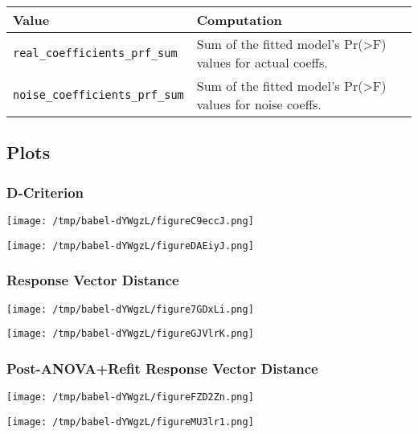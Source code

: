 \documentclass[11pt]{article}
\begin{document}
\begin{center}
\begin{tabular}{ll}
Value & Computation\\
\hline
\texttt{real\_coefficients\_prf\_sum} & Sum of the fitted model's Pr(>F) values for actual coeffs.\\
\texttt{noise\_coefficients\_prf\_sum} & Sum of the fitted model's Pr(>F) values for noise coeffs.\\
\end{tabular}
\end{center}

\subsection{Plots}
\label{sec:org143801b}
\subsubsection{D-Criterion}
\label{sec:orge3fefdf}
\begin{center}
\texttt{[image: /tmp/babel-dYWgzL/figureC9eccJ.png]}
\end{center}

\begin{center}
\texttt{[image: /tmp/babel-dYWgzL/figureDAEiyJ.png]}
\end{center}

\subsubsection{Response Vector Distance}
\label{sec:org4b58813}
\begin{center}
\texttt{[image: /tmp/babel-dYWgzL/figure7GDxLi.png]}
\end{center}

\begin{center}
\texttt{[image: /tmp/babel-dYWgzL/figureGJVlrK.png]}
\end{center}

\subsubsection{Post-ANOVA+Refit Response Vector Distance}
\label{sec:orgec1cd30}
\begin{center}
\texttt{[image: /tmp/babel-dYWgzL/figureFZD2Zn.png]}
\end{center}

\begin{center}
\texttt{[image: /tmp/babel-dYWgzL/figureMU3lr1.png]}
\end{center}
\end{document}
